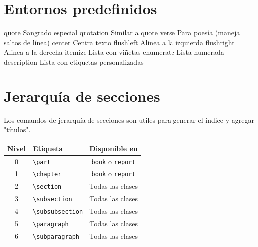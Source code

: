  \section{Entornos predefinidos} 
 
  quote	      Sangrado especial
  quotation	  Similar a quote
  verse	      Para poesía (maneja saltos de línea)
  center	    Centra texto
  flushleft	  Alinea a la izquierda
  flushright	Alinea a la derecha
  itemize	    Lista con viñetas
  enumerate	  Lista numerada
  description	Lista con etiquetas personalizadas
 

\section{Jerarquía de secciones}

Los comandos de jerarquía de secciones son utiles para generar el índice y agregar "títulos". 

\begin{center}
  \begin{tabular}{|c|l|c|}
  \hline
  \textbf{Nivel} & \textbf{Etiqueta} & \textbf{Disponible en} \\
  \hline
  0 & \verb|\part| & \verb|book| o \verb|report| \\
  1 & \verb|\chapter| & \verb|book| o \verb|report| \\
  2 & \verb|\section| & Todas las clases \\
  3 & \verb|\subsection| & Todas las clases \\
  4 & \verb|\subsubsection| & Todas las clases \\
  5 & \verb|\paragraph| & Todas las clases \\
  6 & \verb|\subparagraph| & Todas las clases \\
  \hline
  \end{tabular}
  \end{center}


